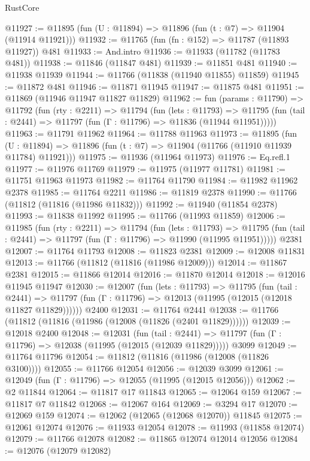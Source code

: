 \begin{lexlean}{RustCore}
\begin{coremodule}
@11927 := @11895 (fun (U : @11894) => @11896 (fun (t : @7) => @11904 (@11914 @11921)))
@11932 := @11765 (fun (fn : @152) => @11787 (@11893 @11927)) @481
@11933 := And.intro
@11936 := @11933 (@11782 (@11783 @481))
@11938 := @11846 (@11847 @481)
@11939 := @11851 @481
@11940 := @11938 @11939
@11944 := @11766 (@11838 (@11940 @11855) @11859)
@11945 := @11872 @481
@11946 := @11871 @11945
@11947 := @11875 @481
@11951 := @11869 (@11946 @11947 @11827 @11829)
@11962 := fun (params : @11790) =>
  @11792
    (fun (rty : @2211) =>
    @11794
      (fun (lets : @11793) =>
      @11795 (fun (tail : @2441) => @11797 (fun (Γ : @11796) => @11836 (@11944 @11951)))))
@11963 := @11791 @11962
@11964 := @11788 @11963
@11973 := @11895
    (fun (U : @11894) => @11896 (fun (t : @7) => @11904 (@11766 (@11910 @11939 @11784) @11921)))
@11975 := @11936 (@11964 @11973)
@11976 := Eq.refl.{1}
@11977 := @11976 @11769
@11979 := @11975 (@11977 @11781)
@11981 := @11751 @11963 @11973
@11982 := @11764 @11790
@11984 := @11982 @11962 @2378
@11985 := @11764 @2211
@11986 := @11819 @2378
@11990 := @11766 (@11812 (@11816 (@11986 @11832)))
@11992 := @11940 (@11854 @2378)
@11993 := @11838 @11992
@11995 := @11766 (@11993 @11859)
@12006 := @11985
    (fun (rty : @2211) =>
    @11794
      (fun (lets : @11793) =>
      @11795 (fun (tail : @2441) => @11797 (fun (Γ : @11796) => @11990 (@11995 @11951)))))
    @2381
@12007 := @11764 @11793
@12008 := @11823 @2381
@12009 := @12008 @11831
@12013 := @11766 (@11812 (@11816 (@11986 @12009)))
@12014 := @11867 @2381
@12015 := @11866 @12014
@12016 := @11870 @12014
@12018 := @12016 @11945 @11947
@12030 := @12007
    (fun (lets : @11793) =>
    @11795
      (fun (tail : @2441) =>
      @11797 (fun (Γ : @11796) => @12013 (@11995 (@12015 (@12018 @11827 @11829))))))
    @2400
@12031 := @11764 @2441
@12038 := @11766 (@11812 (@11816 (@11986 (@12008 (@11826 (@2401 @11829))))))
@12039 := @12018 @2400
@12048 := @12031
    (fun (tail : @2441) => @11797 (fun (Γ : @11796) => @12038 (@11995 (@12015 (@12039 @11829)))))
    @3099
@12049 := @11764 @11796
@12054 := @11812 (@11816 (@11986 (@12008 (@11826 @3100))))
@12055 := @11766 @12054
@12056 := @12039 @3099
@12061 := @12049 (fun (Γ : @11796) => @12055 (@11995 (@12015 @12056)))
@12062 := @2 @11844
@12064 := @11817 @17 @11843
@12065 := @12064 @159
@12067 := @11817 @7 @11842
@12068 := @12067 @164
@12069 := @3294 @17
@12070 := @12069 @159
@12074 := @12062 (@12065 (@12068 @12070)) @11845
@12075 := @12061 @12074
@12076 := @11933 @12054
@12078 := @11993 (@11858 @12074)
@12079 := @11766 @12078
@12082 := @11865 @12074 @12014 @12056
@12084 := @12076 (@12079 @12082)

\end{coremodule}
\end{lexlean}

